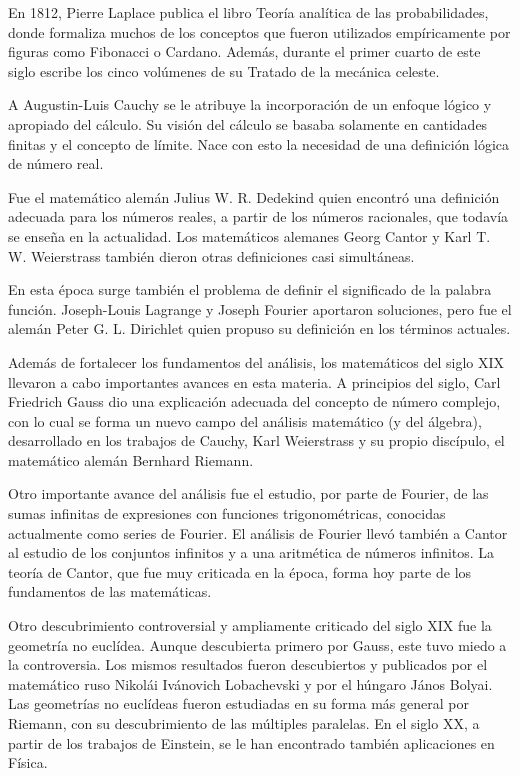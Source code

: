 En 1812, Pierre Laplace publica el libro Teoría analítica de las probabilidades, donde formaliza muchos de los conceptos que fueron utilizados empíricamente por figuras como Fibonacci o Cardano. Además, durante el primer cuarto de este siglo escribe los cinco volúmenes de su Tratado de la mecánica celeste.

A Augustin-Luis Cauchy se le atribuye la incorporación de un enfoque lógico y apropiado del cálculo. Su visión del cálculo se basaba solamente en cantidades finitas y el concepto de límite.
Nace con esto la necesidad de una definición lógica de número real.

Fue el matemático alemán Julius W. R. Dedekind quien encontró una definición adecuada para los números reales, a partir de los números racionales, que todavía se enseña en la actualidad.
Los matemáticos alemanes Georg Cantor y Karl T. W. Weierstrass también dieron otras definiciones casi simultáneas. 

En esta época surge también el problema de definir el significado de la palabra función. Joseph-Louis Lagrange y Joseph Fourier aportaron soluciones, pero fue el alemán Peter  G. L. Dirichlet quien propuso su definición en los términos actuales. 

Además de fortalecer los fundamentos del análisis, los matemáticos del siglo XIX llevaron a cabo importantes avances en esta materia. A principios del siglo, Carl Friedrich Gauss dio una explicación adecuada del concepto de número complejo, con lo cual se forma un nuevo campo del análisis matemático (y del álgebra), desarrollado en los trabajos de Cauchy, Karl Weierstrass y su propio discípulo, el matemático alemán Bernhard Riemann. 

Otro importante avance del análisis fue el estudio, por parte de Fourier, de las sumas infinitas de expresiones con funciones trigonométricas, conocidas actualmente como series de Fourier.  El análisis de Fourier llevó también a Cantor al estudio de los conjuntos infinitos y a una aritmética de números infinitos. La teoría de Cantor, que fue muy criticada en la época, forma hoy parte de los fundamentos de las matemáticas. 

Otro descubrimiento controversial y ampliamente criticado del siglo XIX fue la geometría no euclídea. Aunque descubierta primero por Gauss, este tuvo miedo a la controversia. Los mismos resultados fueron descubiertos y publicados por el matemático ruso Nikolái Ivánovich Lobachevski y por el húngaro János Bolyai. Las geometrías no euclídeas fueron estudiadas en su forma más general por Riemann, con su descubrimiento de las múltiples paralelas. En el siglo XX, a partir de los trabajos de Einstein, se le han encontrado también aplicaciones en Física. 

